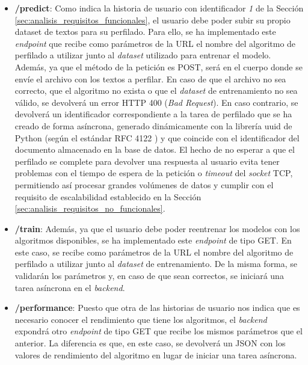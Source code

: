 \begin{itemize}
	\item \textbf{/predict}: Como indica la historia de usuario con identificador \textit{1} de la Sección \ref{sec:analisis_requisitos_funcionales}, el usuario
		debe poder subir su propio dataset de textos para su perfilado. Para ello, se ha implementado este \textit{endpoint} que recibe como parámetros de la URL el
		nombre del algoritmo de perfilado a utilizar junto al \textit{dataset} utilizado para entrenar el modelo. Además, ya que el método de la petición es POST,
		será en el cuerpo donde se envíe
		el archivo con los textos a perfilar. En caso de que el archivo no sea correcto, que el algoritmo no exista o que el \textit{dataset} de entrenamiento
		no sea válido, se devolverá un error HTTP 400 (\textit{Bad Request}). En caso contrario, se devolverá un identificador correspondiente a la tarea de perfilado
		que se ha creado de forma asíncrona, generado dinámicamente con la librería uuid \cite{uuidpython} de Python (según el estándar RFC 4122 \cite{rfc4122}) y que coincide
		con el identificador del documento almacenado en la base de datos. 
		El hecho de no esperar a que el perfilado se complete 
		para devolver una respuesta al usuario evita tener problemas con el tiempo de espera de la petición o \textit{timeout} del \textit{socket} TCP, 
		permitiendo así procesar grandes volúmenes de datos y cumplir con el requisito de escalabilidad establecido en la Sección \ref{sec:analisis_requisitos_no_funcionales}.

	\item \textbf{/train}: Además, ya que el usuario debe poder reentrenar los modelos con los algoritmos disponibles, se ha implementado este \textit{endpoint} de tipo GET.
		En este caso, se recibe como parámetros de la URL el nombre del algoritmo de perfilado a utilizar junto al \textit{dataset} de entrenamiento. De la misma forma,
		se validarán los parámetros y, en caso de que sean correctos, se iniciará una tarea asíncrona en el \textit{backend}.

	\item \textbf{/performance}: Puesto que otra de las historias de usuario nos indica que es necesario conocer el rendimiento que tiene los algoritmos,
		el \textit{backend} expondrá otro \textit{endpoint} de tipo GET que recibe los mismos parámetros que el anterior. La diferencia es que, en este caso,
		se devolverá un JSON con los valores de rendimiento del algoritmo en lugar de iniciar una tarea asíncrona.
	

\end{itemize}

